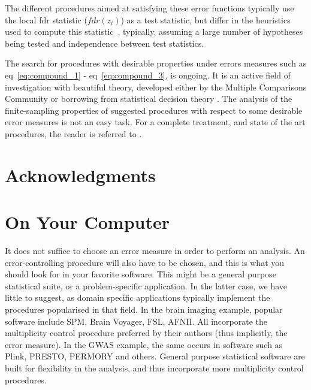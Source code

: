 \documentclass[review,12pt]{article}
\begin{document}
The different procedures aimed at satisfying these error functions typically use the local fdr statistic ($fdr(z_i)$) as a test statistic, but differ in the heuristics used to  compute this statistic~\cite[eg.][]{storey_direct_2002,efron_microarrays_2008,sun_oracle_2007}, typically, assuming a large number of hypotheses being tested and independence between test statistics. 

The search for procedures with desirable properties under errors measures such as eq~\ref{eq:compound_1}  - eq~\ref{eq:compound_3}, is ongoing. It is an active field of investigation with beautiful theory, developed either by the Multiple Comparisons Community or borrowing from statistical decision theory \cite[see][]{sun_oracle_2007}. The analysis of the finite-sampling properties of suggested procedures with respect to some desirable error measures is not an easy task.  For a complete treatment, and state of the art procedures, the reader is referred to \cite{efron_large-scale_2010}.








\section{Acknowledgments}








\appendix

\section{\label{sec:on_your_pc} On Your Computer}
It does not suffice to choose an error measure in order to perform an analysis. An error-controlling procedure will also have to be chosen, and this is what you should look for in your favorite software. This might be a general purpose statistical suite, or a problem-specific application. In the latter case, we have little to suggest, as domain specific applications typically implement the procedures popularised in that field. 
In the brain imaging example, popular software include SPM, Brain Voyager, FSL, AFNII. All incorporate the multiplicity control procedure preferred by their authors (thus implicitly, the error measure). 
In the GWAS example, the same occurs in software such as Plink, PRESTO, PERMORY and others. 
General purpose statistical software are built for flexibility in the analysis, and thus incorporate more multiplicity control procedures. 
\end{document}
